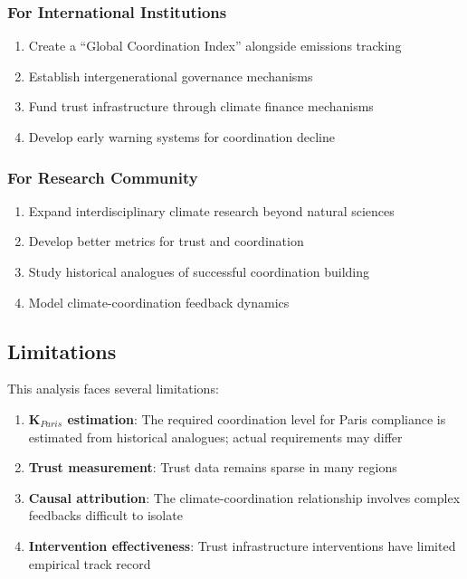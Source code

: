 \documentclass[12pt,a4paper]{article}
\begin{document}
\subsubsection{For International Institutions}

\begin{enumerate}
    \item Create a ``Global Coordination Index'' alongside emissions tracking
    \item Establish intergenerational governance mechanisms
    \item Fund trust infrastructure through climate finance mechanisms
    \item Develop early warning systems for coordination decline
\end{enumerate}

\subsubsection{For Research Community}

\begin{enumerate}
    \item Expand interdisciplinary climate research beyond natural sciences
    \item Develop better metrics for trust and coordination
    \item Study historical analogues of successful coordination building
    \item Model climate-coordination feedback dynamics
\end{enumerate}

\subsection{Limitations}

This analysis faces several limitations:

\begin{enumerate}
    \item \textbf{K$_{Paris}$ estimation}: The required coordination level for Paris compliance is estimated from historical analogues; actual requirements may differ
    \item \textbf{Trust measurement}: Trust data remains sparse in many regions
    \item \textbf{Causal attribution}: The climate-coordination relationship involves complex feedbacks difficult to isolate
    \item \textbf{Intervention effectiveness}: Trust infrastructure interventions have limited empirical track record
\end{enumerate}
\end{document}
